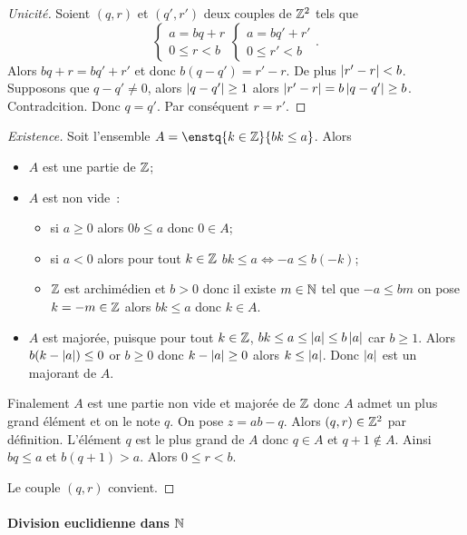 \begin{proof}[Unicité]
  Soient $(q,r)$ et $(q',r')$ deux couples de $\mathbb{Z}^2$ tels que
  \begin{equation}
    \begin{cases}
      a=bq+r \\ 0 \leq r < b
    \end{cases}
    \begin{cases}
      a=bq'+r' \\ 0 \leq r' < b
    \end{cases}.
  \end{equation}
Alors $bq+r=bq'+r'$ et donc $b(q-q')=r'-r$. De plus $\left\lvert r'-r\right\rvert < b$. Supposons que $q-q' \neq 0$, alors $\left\lvert q-q'\right\rvert \geq 1$ alors $\left\lvert r'-r\right\rvert=b\left\lvert q-q'\right\rvert \geq b$. Contradcition. Donc $q=q'$. Par conséquent $r=r'$.
\end{proof}
\begin{proof}[Existence]
  Soit l'ensemble $A=\enstq{k \in \Z}{bk \leq a}$. Alors 
  \begin{itemize}
  \item $A$ est une partie de $\mathbb{Z}$;
  \item $A$ est non vide~:
    \begin{itemize}
    \item si $a \geq 0$ alors $0b \leq a$ donc $0 \in A$;
    \item si $a < 0$ alors pour tout $k \in \mathbb{Z}$ $bk \leq a \iff -a \leq b(-k)$;
    \item $\mathbb{Z}$ est archimédien et $b>0$ donc il existe $m \in \mathbb{N}$ tel que $-a \leq bm$ on pose $k=-m \in \mathbb{Z}$ alors $bk \leq a$ donc $k \in A$.
    \end{itemize}
  \item $A$ est majorée, puisque pour tout $k \in \mathbb{Z}$, $bk \leq a \leq \left\lvert a\right\rvert \leq b \left\lvert a\right\rvert$ car $b \geq 1$. Alors $b(k-\left\lvert a\right\rvert) \leq 0$ or $b \geq 0$ donc $k-\left\lvert a\right\rvert \geq 0$ alors $k \leq \left\lvert a\right\rvert$. Donc $\left\lvert a\right\rvert$ est un majorant de $A$.
  \end{itemize}

Finalement $A$ est une partie non vide et majorée de $\mathbb{Z}$ donc $A$ admet un plus grand élément et on le note $q$. On pose $z=ab-q$. Alors $(q,r) \in \mathbb{Z}^2$ par définition. L'élément $q$ est le plus grand de $A$ donc $q \in A$ et $q+1 \notin A$. Ainsi $bq \leq a$ et $b(q+1) > a$. Alors $0 \leq r < b$. 

Le couple $(q,r)$ convient.
\end{proof}

\paragraph{Division euclidienne dans $\mathbb{N}$}

